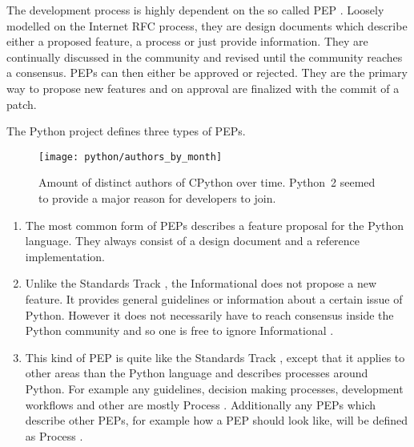 The development process is highly dependent on the so called \ac{PEP}
\cite{Warsaw2000}. Loosely modelled on the Internet \acl{RFC} process, they are
design documents which describe either a proposed feature, a process or just
provide information. They are continually discussed in the community and
revised until the community reaches a consensus. \acp{PEP} can then either be
approved or rejected. They are the primary way to propose new features and on
approval are finalized with the commit of a patch.

The Python project defines three types of \acp{PEP}.

\begin{figure}[htbp]
  \centering
  \texttt{[image: python/authors\_by\_month]}
  \caption[Authors by Month, Python]
  {Amount of distinct authors of CPython over time. Python~2 seemed to provide
    a major reason for developers to join.}
  \label{fig:python:abm}
\end{figure}

\begin{enumerate}

  \item {} The most common form of
    \acp{PEP} describes a feature proposal for the Python language. They always
    consist of a design document and a reference implementation.

  \item {} Unlike the Standards Track
    , the Informational  does not propose a
    new feature. It provides general guidelines or information about a certain
    issue of Python. However it does not necessarily have to reach consensus
    inside the Python community and so one is free to ignore Informational
    .

  \item {} This kind of \ac{PEP} is quite like
    the Standards Track , except that it applies to other
    areas than the Python language and describes processes around Python. For
    example any guidelines, decision making processes, development workflows
    and other are mostly Process . Additionally any \acp{PEP}
    which describe other \acp{PEP}, for example how a \ac{PEP} should look
    like, will be defined as Process .

\end{enumerate}

